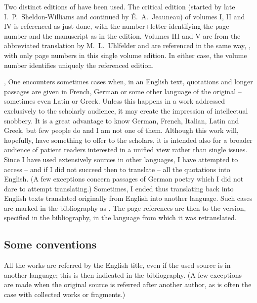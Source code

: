 Two distinct editions of \citeauthor*{Periphyseon} have been used. The critical
edition (started by late I.~P.~Sheldon-Williams and continued by
\'{E}.~A.~Jeauneau) of volumes I, II and IV is referenced as just done, with the
number+letter identifying the page number and the manuscript as in the edition.
Volumes III and V are from the abbreviated translation by M.~L.~Uhlfelder and
are referenced in the same way, \citeauthor*{Periphy}, with only page numbers
in this single volume edition. In either case, the volume number identifies
uniquely the referenced edition. 


\sep
%
One encounters sometimes cases when, in an English text, quotations and longer
passages are given in French, German or some other language of the original --
sometimes even Latin or Greek. Unless this happens in a work addressed
exclusively to the scholarly audience, it may create the impression of
intellectual snobbery.  It is a great advantage to know German, French, Italian,
Latin and Greek, but few people do and I am not one of them. Although this work
will, hopefully, have something to offer to the scholars, it is intended also
for a broader audience of patient readers interested in a unified view rather
than single issues.  Since I have used extensively sources in other languages, I
have attempted to access -- and if I did not succeed then to translate -- all
the quotations into English. (A few exceptions concern passages of German poetry
which I did not dare to attempt translating.)  Sometimes, I ended thus
translating back into English texts translated originally from English into
another language.  Such cases are marked in the bibliography as . The page references are then to the version, specified
in the bibliography, in the language from which it was retranslated.

\subsection*{Some conventions}
All the works are referred by the English title, even if the used source is in
another language; this is then indicated in the bibliography. (A few exceptions
are made when the original source is referred after 
another author, as is often the case with collected works or fragments.)

